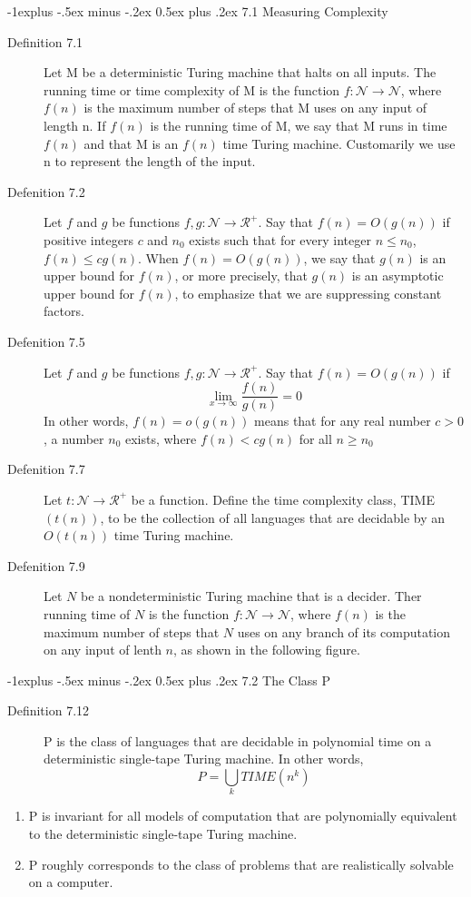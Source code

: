 \documentclass[10pt,landscape]{article}
\makeatletter
\renewcommand{\subsection}{\@startsection{subsection}{2}{0mm}%
                                {-1explus -.5ex minus -.2ex}%
                                {0.5ex plus .2ex}%
                                {\normalfont\normalsize\bfseries}}
\makeatother
\begin{document}
\begin{multicols}{3}
\subsection{7.1 Measuring Complexity}
\begin{description}
  \item[Definition 7.1] Let M be a deterministic Turing machine that halts on all inputs. The running time or time complexity of M is the function $f: \mathcal{N} \rightarrow \mathcal{N}$, where $f(n)$ is the maximum number of steps that M uses on any input of length n. If $f(n)$ is the running time of M, we say that M runs in time $f(n)$ and that M is an $f(n)$ time Turing machine. Customarily we use n to represent the length of the input. 
  \item[Defenition 7.2] Let $f$ and $g$ be functions $f,g: \mathcal{N} \rightarrow \mathcal{R}^{+}$. Say that $f(n) = O(g(n))$ if positive integers $c$ and $n_{0}$ exists such that for every integer $ n \leq n_{0}$, $f(n) \leq cg(n)$. When $f(n) = O(g(n))$, we say that $g(n)$ is an upper bound for $f(n)$, or more precisely, that $g(n)$ is an asymptotic upper bound for $f(n)$, to emphasize that we are suppressing constant factors. 
  \item[Defenition 7.5] Let $f$ and $g$ be functions $f,g: \mathcal{N} \rightarrow \mathcal{R}^{+}$. Say that $f(n) = O(g(n))$ if $$\lim_{x\to\infty} \frac{f(n)}{g(n)} = 0 $$ In other words, $f(n) = o(g(n))$ means that for any real number $c > 0$, a number $n_{0}$ exists, where $f(n) < cg(n)$ for all $n \geq n_{0}$
  \item[Defenition 7.7] Let $t:\mathcal{N} \rightarrow \mathcal{R}^{+}$ be a function. Define the time complexity class, TIME$(t(n))$, to be the collection of all languages that are decidable by an $O(t(n))$ time Turing machine.
  \item[Defenition 7.9] Let $N$ be a nondeterministic Turing machine that is a decider. Ther running time of $N$ is the function $f:\mathcal{N} \rightarrow \mathcal{N}$, where $f(n)$ is the maximum number of steps that $N$ uses on any branch of its computation on any input of lenth $n$, as shown in the following figure.
\end{description}

\subsection{7.2 The Class P}
\begin{description}
  \item[Definition 7.12] P is the class of languages that are decidable in polynomial time on a deterministic single-tape Turing machine. In other words, $$P = \bigcup_{k} TIME(n^{k})$$
\end{description}
\begin{enumerate}
  \item P is invariant for all models of computation that are polynomially equivalent to the deterministic single-tape Turing machine.
  \item P roughly corresponds to the class of problems that are realistically solvable on a computer. 
\end{enumerate}




\end{multicols}
\end{document}
